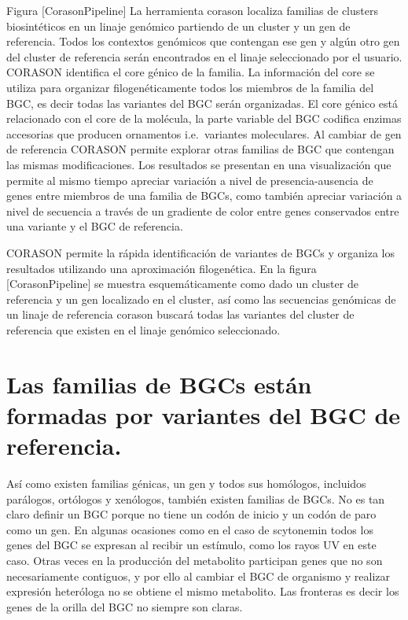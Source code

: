 \documentclass[12pt,twoside]{reedthesis}
\begin{document}
  Figura {[}CorasonPipeline{]} La herramienta corason localiza familias de
  clusters biosintéticos en un linaje genómico partiendo de un cluster y
  un gen de referencia. Todos los contextos genómicos que contengan ese
  gen y algún otro gen del cluster de referencia serán encontrados en el
  linaje seleccionado por el usuario. CORASON identifica el core génico de
  la familia. La información del core se utiliza para organizar
  filogenéticamente todos los miembros de la familia del BGC, es decir
  todas las variantes del BGC serán organizadas. El core génico está
  relacionado con el core de la molécula, la parte variable del BGC
  codifica enzimas accesorias que producen ornamentos i.e.~variantes
  moleculares. Al cambiar de gen de referencia CORASON permite explorar
  otras familias de BGC que contengan las mismas modificaciones. Los
  resultados se presentan en una visualización que permite al mismo tiempo
  apreciar variación a nivel de presencia-ausencia de genes entre miembros
  de una familia de BGCs, como también apreciar variación a nivel de
  secuencia a través de un gradiente de color entre genes conservados
  entre una variante y el BGC de referencia.
  
  CORASON permite la rápida identificación de variantes de BGCs y organiza
  los resultados utilizando una aproximación filogenética. En la figura
  {[}CorasonPipeline{]} se muestra esquemáticamente como dado un cluster
  de referencia y un gen localizado en el cluster, así como las secuencias
  genómicas de un linaje de referencia corason buscará todas las variantes
  del cluster de referencia que existen en el linaje genómico
  seleccionado.
  
  \section{Las familias de BGCs están formadas por variantes del BGC de
  referencia.}\label{las-familias-de-bgcs-estan-formadas-por-variantes-del-bgc-de-referencia.}
  
  Así como existen familias génicas, un gen y todos sus homólogos,
  incluidos parálogos, ortólogos y xenólogos, también existen familias de
  BGCs. No es tan claro definir un BGC porque no tiene un codón de inicio
  y un codón de paro como un gen. En algunas ocasiones como en el caso de
  scytonemin todos los genes del BGC se expresan al recibir un estímulo,
  como los rayos UV en este caso. Otras veces en la producción del
  metabolito participan genes que no son necesariamente contiguos, y por
  ello al cambiar el BGC de organismo y realizar expresión heteróloga no
  se obtiene el mismo metabolito. Las fronteras es decir los genes de la
  orilla del BGC no siempre son claras.
  
\end{document}
